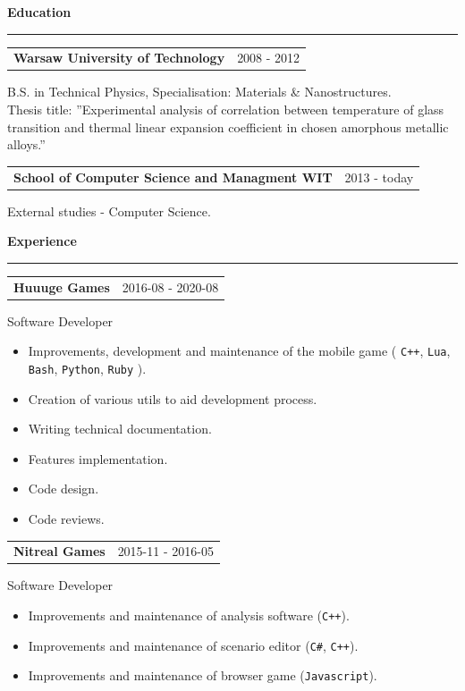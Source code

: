\documentclass{article}
\newcommand{\header}[1]
{
	\textbf{\large #1}
	\vspace{0.005\textheight}
	\hrule
	\vspace{0.005\textheight}
}
\begin{document}
\large
\header{Education}
\begin{tabular}{@{} m{} R{0.37\textwidth} }
\textbf{Warsaw University of Technology}	& {2008 - 2012} \\
\end{tabular}
 B.S. in Technical Physics, Specialisation: Materials \& Nanostructures.\\
Thesis title: ”Experimental analysis of correlation between temperature of glass transition and thermal linear  expansion coefficient in chosen amorphous metallic alloys.”
\begin{tabular}{@{} m{} R{0.37\textwidth} }
\textbf{School of Computer Science and Managment WIT}	& {2013 - today} \\
\end{tabular}
External studies - Computer Science.
\flushleft

\header{Experience}

\begin{tabular}{@{} m{} R{0.37\textwidth} }
\textbf{Huuuge Games}	& {2016-08 - 2020-08}
\end{tabular}
Software Developer\\
\begin{itemize}
	\item Improvements, development and maintenance of the mobile game ( \texttt{C++}, \texttt{Lua}, \texttt{Bash}, \texttt{Python}, \texttt{Ruby} ).
	\item Creation of various utils to aid development process.
	\item Writing technical documentation.
	\item Features implementation.
	\item Code design.
	\item Code reviews.
\end{itemize}

\begin{tabular}{@{} m{} R{0.37\textwidth} }
\textbf{Nitreal Games}	& {2015-11 - 2016-05}
\end{tabular}
Software Developer\\
\begin{itemize}
	\item Improvements and maintenance of analysis software (\texttt{C++}).
	\item Improvements and maintenance of scenario editor (\texttt{C\#}, \texttt{C++}).
	\item Improvements and maintenance of browser game (\texttt{Javascript}).
\end{itemize}
\end{document}

